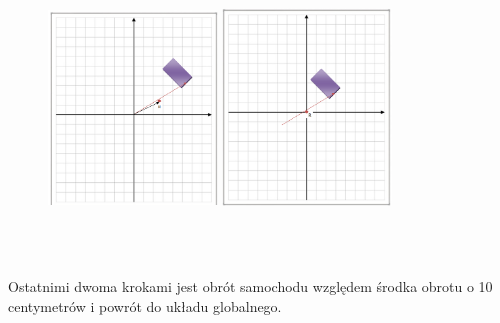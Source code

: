 \documentclass[a4paper, 12pt]{report}
\begin{document}
			\begin{figure}[H]
				\centering
				\includegraphics[height=8cm, width=0.4\textwidth]{./img/5.png}
				\includegraphics[height=8cm, width=0.4\textwidth]{./img/6.png}
			\end{figure}
			\noindent Ostatnimi dwoma krokami jest obrót samochodu względem środka obrotu o 10 centymetrów \linebreak i powrót do układu globalnego.
\end{document}

